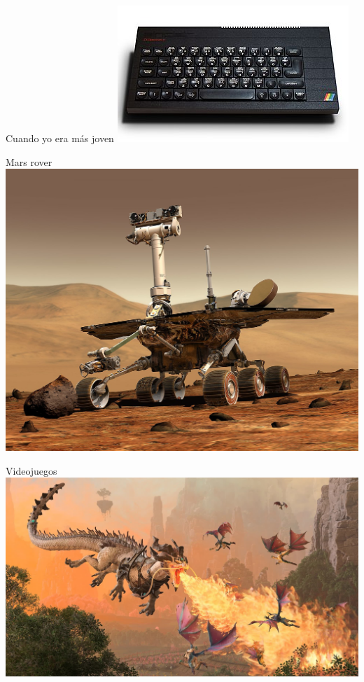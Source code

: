 \begin{frame}{Cuando yo era más joven}
\pause
\centering
\includegraphics[height=.85\textheight]{img/spectrum.jpg}
\end{frame}

\begin{frame}{Mars rover}
\centering
\includegraphics[height=.85\textheight]{img/opportunity-rover.jpg}
\end{frame}

\begin{frame}{Videojuegos}
\centering
\includegraphics[height=.85\textheight]{img/war-hammer.jpg}
\end{frame}

